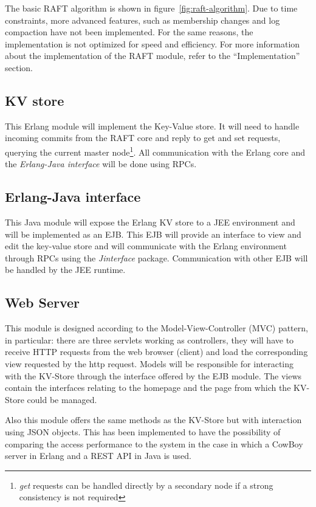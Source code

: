 \documentclass[a4paper]{article}
\begin{document}
The basic RAFT algorithm is shown in figure~\ref{fig:raft-algorithm}. Due to 
time constraints, more advanced features, such as membership changes and 
log compaction have not been implemented. For the same reasons, the 
implementation is not optimized for speed and efficiency. For more information
about the implementation of the RAFT module, refer to the ``Implementation''
section.

\subsection{KV store}
\label{sec:kv-store}

This Erlang module will implement the Key-Value store. It will need to 
handle incoming commits from the RAFT core and reply to get and set 
requests, querying the current master node\footnote{\emph{get} requests can 
be handled directly by a secondary node if a strong consistency is not 
required}. All communication with the Erlang core and the \emph{Erlang-Java
interface} will be done using RPCs.

\subsection{Erlang-Java interface}
\label{sec:erlang-java}

This Java module will expose the Erlang KV store to a JEE environment and 
will be implemented as an EJB. This EJB will provide an interface to 
view and edit the key-value store and will communicate with the Erlang 
environment through RPCs using the \emph{Jinterface} package. Communication
with other EJB will be handled by the JEE runtime.

\subsection{Web Server}
\label{sec:web-server}
This module is designed according to the Model-View-Controller (MVC) pattern, in particular:
there are three servlets working as controllers, they will have to receive HTTP requests from the web browser (client) and load the corresponding view requested by the http request.
Models will be responsible for interacting with the KV-Store through the interface offered by the EJB module.
The views contain the interfaces relating to the homepage and the page from which the KV-Store could be managed.

Also this module offers the same methods as the KV-Store but with interaction using JSON objects. This has been implemented to have the possibility of comparing the access performance to the system in the case in which a CowBoy server in Erlang and a REST API in Java is used.
\end{document}
